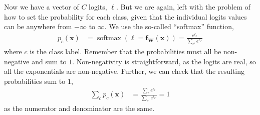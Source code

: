 \documentclass{article}
\newcommand{\bracket}[3]{\left#1 #3 \right#2}
\renewcommand{\b}{\bracket{(}{)}}
\newcommand{\x}{\mathbf{x}}
\newcommand{\f}{\mathbf{f}}
\newcommand{\W}{\mathbf{W}}
\newcommand{\logits}{\ell}
\newcommand{\vlogits}{\boldsymbol{\logits}}
\newcommand{\softmax}{\operatorname{softmax}\b}
\begin{document}
Now we have a vector of $C$ logits, $\vlogits$.
But we are again, left with the problem of how to set the probability for each class, given that the individual logits values can be anywhere from $-\infty$ to $\infty$.
We use the so-called ``softmax'' function,
\begin{align}
  p_c(\x) &= \softmax{\vlogits = \f_{\W}(\x)} = \frac{e^{\logits_c}}{\sum_{c'} e^{\logits_{c'}}}
\end{align}
where $c$ is the class label.
Remember that the probabilities must all be non-negative and sum to $1$.
Non-negativity is straightforward, as the logits are real, so all the exponentials are non-negative.
Further, we can check that the resulting probabilities sum to $1$,
\begin{align}
  \sum_{c} p_c(\x) &= \frac{\sum_c e^{\logits_c}}{\sum_{c'} e^{\logits_{c'}}} = 1
\end{align}
as the numerator and denominator are the same.
\end{document}
